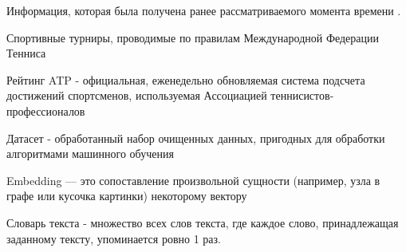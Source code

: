 \Defines %
\begin{description}
	
	\item[Априорная информация]  Информация, которая была получена ранее рассматриваемого момента времени \cite{def01}.
	\item[Теннис] Спортивные турниры, проводимые по правилам Международной Федерации Тенниса \cite{Book04}
	\item Рейтинг ATP -  официальная, еженедельно обновляемая система подсчета достижений спортсменов, используемая Ассоциацией теннисистов-профессионалов \cite{def02}
	\item Датасет - обработанный набор очищенных данных, пригодных для обработки алгоритмами машинного обучения \cite{def03}
	\item Embedding — это сопоставление произвольной сущности (например, узла в графе или кусочка картинки) некоторому вектору \cite{Book27}
	\item Словарь текста - множество всех слов текста, где каждое слово, принадлежащая заданному тексту, упоминается ровно 1 раз.
	
	
\end{description}

